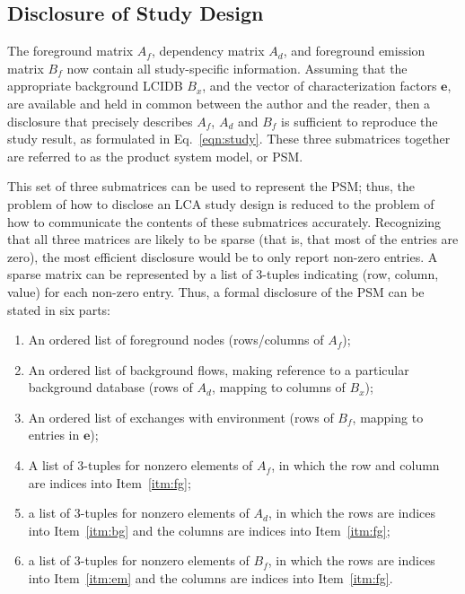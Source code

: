 \subsection{Disclosure of Study Design}

The foreground matrix $A_f$, dependency matrix $A_d$, and foreground emission matrix $B_f$ now contain all study-specific information.  Assuming that the appropriate background LCIDB $B_x$, and the vector of characterization factors $\mathbf{e}$, are available and held in common between the author and the reader, then a disclosure that precisely describes $A_f$, $A_d$ and $B_f$ is sufficient to reproduce the study result, as formulated in Eq.~\ref{eqn:study}.  These three submatrices together are referred to as the product system model, or PSM.

This set of three submatrices can be used to represent the PSM; thus, the problem of how to disclose an LCA study design is reduced to the problem of how to communicate the contents of these submatrices accurately.  Recognizing that all three matrices are likely to be sparse (that is, that most of the entries are zero), the most efficient disclosure would be to only report non-zero entries.  A sparse matrix can be represented by a list of 3-tuples indicating (row, column, value) for each non-zero entry.  Thus, a formal disclosure of the PSM can be stated in six parts:
\begin{enumerate}[label={\em d-\roman*}., ref={\em d-\roman*}]
\item\label{itm:fg} An ordered list of foreground nodes (rows/columns of $A_f$);
\item\label{itm:bg} An ordered list of background flows, making reference to a particular background database (rows of $A_d$, mapping to columns of $B_x$);
\item\label{itm:em} An ordered list of exchanges with environment (rows of $B_f$, mapping to entries in $\mathbf{e}$);
\item\label{itm:af} A list of 3-tuples for nonzero elements of $A_f$, in which the row and column are indices into Item~\ref{itm:fg};
\item\label{itm:ad} a list of 3-tuples for nonzero elements of $A_d$, in which the rows are indices into Item~\ref{itm:bg} and the columns are indices into Item~\ref{itm:fg};
\item\label{itm:bf} a list of 3-tuples for nonzero elements of $B_f$, in which the rows are indices into Item~\ref{itm:em} and the columns are indices into Item~\ref{itm:fg}.
\end{enumerate}

